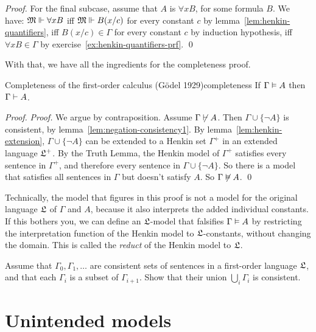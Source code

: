 \begin{proof}
  For the final subcase,
  assume that $A$ is $\forall x B$,
  for some formula $B$.
  We have:
  $\mathfrak{M} \Vdash \forall x B$ iff
  $\mathfrak{M} \Vdash B(x/c)$ for every constant $c$ by lemma~\ref{lem:henkin-quantifiers},
  iff $B(x/c) \in \Gamma$ for every constant $c$ by induction hypothesis,
  iff $\forall x B \in \Gamma$ by exercise~\ref{ex:henkin-quantifiers-prf}.
  \qed
\end{proof}

With that,
we have all the ingredients for the completeness proof.

\begin{theorem}{Completeness of the first-order calculus (Gödel 1929)}{completeness}
  If $\Gamma \vDash A$ then $\Gamma \vdash A$.
\end{theorem}

\begin{proof}
  \emph{Proof.}
  We argue by contraposition.
  Assume $\Gamma \not\vdash A$.
  Then $\Gamma \cup \{\neg A\}$ is consistent,
  by lemma~\ref{lem:negation-consistency1}.
  By lemma~\ref{lem:henkin-extension},
  $\Gamma \cup \{ \neg A \}$ can be extended to a Henkin set $\Gamma^{+}$ in an extended language $\mathfrak{L}^{+}$.
  By the Truth Lemma,
  the Henkin model of $\Gamma^{+}$ satisfies every sentence in $\Gamma^{+}$,
  and therefore every sentence in $\Gamma \cup \{\neg A\}$.
  So there is a model that satisfies all sentences in $\Gamma$ but doesn't satisfy $A$.
  So $\Gamma \not\vDash A$. \qed
\end{proof}

Technically,
the model that figures in this proof is not
a model for the original language $\mathfrak{L}$ of $\Gamma$ and $A$,
because it also interprets the added individual constants.
If this bothers you,
we can define an $\mathfrak{L}$-model that falsifies $\Gamma \vDash A$
by restricting the interpretation function of the Henkin model
to $\mathfrak{L}$-constants,
without changing the domain.
This is called the \emph{reduct} of the Henkin model to $\mathfrak{L}$.

\begin{exercise}
  Assume that $\Gamma_{0}, \Gamma_{1}, \ldots$ are consistent sets of sentences
  in a first-order language $\mathfrak{L}$,
  and that each $\Gamma_{i}$ is a subset of $\Gamma_{i+1}$.
  Show that their union $\bigcup_{i} \Gamma_{i}$ is consistent.
\end{exercise}

\section{Unintended models}
\label{sec:unintended}


